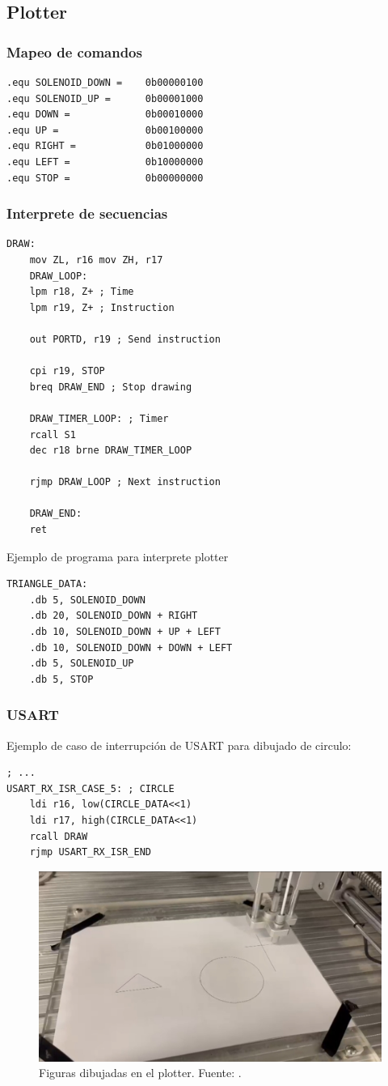 \subsection{Plotter}

\subsubsection{Mapeo de comandos}
\begin{verbatim}
.equ SOLENOID_DOWN =	0b00000100
.equ SOLENOID_UP =		0b00001000
.equ DOWN =				0b00010000
.equ UP =				0b00100000
.equ RIGHT =			0b01000000
.equ LEFT =				0b10000000
.equ STOP =				0b00000000
\end{verbatim}
\subsubsection{Interprete de secuencias}
\begin{verbatim}
DRAW:
    mov ZL, r16 mov ZH, r17
    DRAW_LOOP:
    lpm r18, Z+ ; Time
    lpm r19, Z+ ; Instruction

    out PORTD, r19 ; Send instruction

    cpi r19, STOP
    breq DRAW_END ; Stop drawing

    DRAW_TIMER_LOOP: ; Timer
    rcall S1
    dec r18 brne DRAW_TIMER_LOOP 

    rjmp DRAW_LOOP ; Next instruction

    DRAW_END:
    ret
\end{verbatim}

Ejemplo de programa para interprete plotter
\begin{verbatim}
TRIANGLE_DATA:
    .db 5, SOLENOID_DOWN	
    .db 20, SOLENOID_DOWN + RIGHT			
    .db 10, SOLENOID_DOWN + UP + LEFT		
    .db 10, SOLENOID_DOWN + DOWN + LEFT
    .db 5, SOLENOID_UP		
    .db 5, STOP
\end{verbatim}

\subsubsection{USART}
Ejemplo de caso de interrupción de USART para dibujado de circulo:
\begin{verbatim}
; ...
USART_RX_ISR_CASE_5: ; CIRCLE
    ldi r16, low(CIRCLE_DATA<<1) 
    ldi r17, high(CIRCLE_DATA<<1)
    rcall DRAW
    rjmp USART_RX_ISR_END
\end{verbatim}

\begin{figure}[H]
  \centering
  \includegraphics[width=\linewidth]{./Anexos/Resultados/Plotter/Dibujos.jpg}
  \caption{Figuras dibujadas en el plotter. Fuente: \cite{LabDrive}.}
  \label{fig:plotter_figuras}
\end{figure}